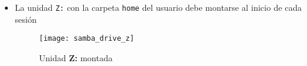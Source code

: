 \documentclass[../main.tex]{subfiles}
\begin{document}
\begin{itemize}
  \item La unidad \texttt{Z:} con la carpeta \texttt{home} del usuario debe
        montarse al inicio de cada sesión
        \begin{figure}[H]
          \centering
          \texttt{[image: samba\_drive\_z]}
          \caption{Unidad \textbf{Z:} montada}\label{fig:samba_drive_z}
        \end{figure}

\end{itemize}
\end{document}
